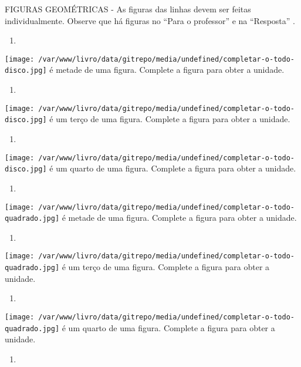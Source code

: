 \documentclass[a4paper,12pt,twoside]{book}
\begin{document}
\begin{imagem*}[breakable]{}{}   FIGURAS GEOMÉTRICAS - As figuras das linhas devem ser feitas individualmente. Observe que há figuras no   ``Para o professor''   e na   ``Resposta''  .  
\end{imagem*}
\begin{enumerate} [\quad a)] %
  \item     
\end{enumerate} %
\texttt{[image: /var/www/livro/data/gitrepo/media/undefined/completar-o-todo-disco.jpg]} é metade de uma figura. Complete a figura para obter a unidade.
\begin{enumerate} [\quad a)] %
  \item     
\end{enumerate} %
\texttt{[image: /var/www/livro/data/gitrepo/media/undefined/completar-o-todo-disco.jpg]} é um terço de uma figura. Complete a figura para obter a unidade.
\begin{enumerate} [\quad a)] %
  \item     
\end{enumerate} %
\texttt{[image: /var/www/livro/data/gitrepo/media/undefined/completar-o-todo-disco.jpg]} é um quarto de uma figura. Complete a figura para obter a unidade.
\begin{enumerate} [\quad a)] %
  \item     
\end{enumerate} %
\texttt{[image: /var/www/livro/data/gitrepo/media/undefined/completar-o-todo-quadrado.jpg]} é metade de uma figura. Complete a figura para obter a unidade.
\begin{enumerate} [\quad a)] %
  \item     
\end{enumerate} %
\texttt{[image: /var/www/livro/data/gitrepo/media/undefined/completar-o-todo-quadrado.jpg]} é um terço de uma figura. Complete a figura para obter a unidade.
\begin{enumerate} [\quad a)] %
  \item     
\end{enumerate} %
\texttt{[image: /var/www/livro/data/gitrepo/media/undefined/completar-o-todo-quadrado.jpg]} é um quarto de uma figura. Complete a figura para obter a unidade.
\begin{enumerate} [\quad a)] %
  \item     
\end{enumerate} %
\end{document}
